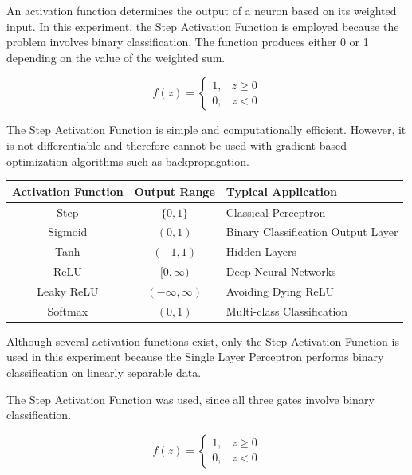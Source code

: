 \documentclass[11pt,a4paper]{article}
\begin{document}
An activation function determines the output of a neuron based on its weighted input. In this experiment, the Step Activation Function is employed because the problem involves binary classification. The function produces either 0 or 1 depending on the value of the weighted sum.

\[
f(z)=
\begin{cases}
1,&z\ge0\\
0,&z<0
\end{cases}
\]

The Step Activation Function is simple and computationally efficient. However, it is not differentiable and therefore cannot be used with gradient-based optimization algorithms such as backpropagation.

\vspace{0.15cm}

\begin{center}
\begin{tabular}{|c|c|p{7cm}|}
\hline
\textbf{Activation Function} & \textbf{Output Range} & \textbf{Typical Application}\\
\hline
Step & $\{0,1\}$ & Classical Perceptron\\
\hline
Sigmoid & $(0,1)$ & Binary Classification Output Layer\\
\hline
Tanh & $(-1,1)$ & Hidden Layers\\
\hline
ReLU & $[0,\infty)$ & Deep Neural Networks\\
\hline
Leaky ReLU & $(-\infty,\infty)$ & Avoiding Dying ReLU\\
\hline
Softmax & $(0,1)$ & Multi-class Classification\\
\hline
\end{tabular}
\end{center}

\vspace{0.3cm}

Although several activation functions exist, only the Step Activation Function is used in this experiment because the Single Layer Perceptron performs binary classification on linearly separable data.

 





The Step Activation Function was used, since all three gates involve binary classification.

\[
f(z)=
\begin{cases}
1,&z\ge0\\
0,&z<0
\end{cases}
\]
\end{document}
